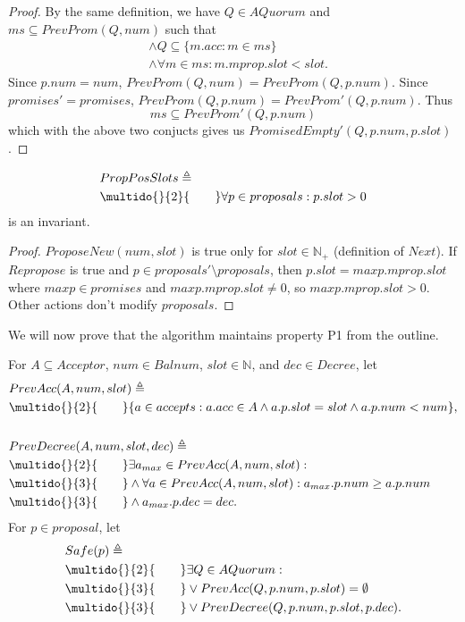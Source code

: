 \documentclass[12pt,a4paper,en]{pracamgr}
\newcommand{\mbb}[1]{\mathbb{#1}}
\newcommand{\ind}[1]{\multido{}{#1}{\qquad}}
\begin{document}
\begin{proof}
    By the same definition, we have $Q \in AQuorum$ and $ms \subseteq PrevProm(Q, num)$ such that
    \begin{align*}
        & \land Q \subseteq \{m.acc: m \in ms\}\\
        & \land \forall m \in ms: m.mprop.slot < slot.
    \end{align*}
    Since $p.num = num$,
    $PrevProm(Q, num) = PrevProm(Q, p.num)$. Since $promises' = promises$,
    $PrevProm(Q, p.num) = PrevProm'(Q, p.num)$. Thus
    $$ ms \subseteq PrevProm'(Q, p.num) $$
    which with the above two conjucts gives us $PromisedEmpty'(Q, p.num, p.slot)$.
\end{proof}

\begin{lemma}
    \begin{align*}
        & PropPosSlots \triangleq\\
        & \ind{2} \forall p \in proposals: p.slot > 0
    \end{align*}
    is an invariant.
\end{lemma}
\begin{proof}
    $ProposeNew(num, slot)$ is true only for $slot \in \mbb N_+$ (definition of $Next$). If $Repropose$ is true and $p \in proposals' \setminus proposals$, then $p.slot = maxp.mprop.slot$ where $maxp \in promises$ and $maxp.mprop.slot \neq 0$, so $maxp.mprop.slot > 0$. Other actions don't modify $proposals$.
\end{proof}

We will now prove that the algorithm maintains property P1 from the outline.

For $A \subseteq Acceptor$, $num \in Balnum$, $slot \in \mbb N$, and $dec \in Decree$, let
\begin{align*}
    & PrevAcc(A, num, slot) \triangleq\\
    & \ind{2} \{a \in accepts: a.acc \in A \land a.p.slot = slot \land a.p.num < num\},\\\\
    & PrevDecree(A, num, slot, dec) \triangleq\\
    & \ind{2} \exists a_{max} \in PrevAcc(A, num, slot):\\
    & \ind{3} \land \forall a \in PrevAcc(A, num, slot): a_{max}.p.num \ge a.p.num\\
    & \ind{3} \land a_{max}.p.dec = dec.
\end{align*}
For $p \in proposal$, let
\begin{align*}
    & Safe(p) \triangleq\\
    & \ind{2} \exists Q \in AQuorum:\\
    & \ind{3} \lor PrevAcc(Q, p.num, p.slot) = \emptyset\\
    & \ind{3} \lor PrevDecree(Q, p.num, p.slot, p.dec).
\end{align*}
\end{document}
